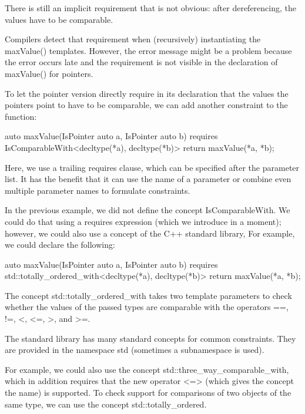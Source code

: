 There is still an implicit requirement that is not obvious: after dereferencing, the values have to be comparable.

Compilers detect that requirement when (recursively) instantiating the maxValue() templates. However, the error message might be a problem because the error occurs late and the requirement is not visible in the declaration of maxValue() for pointers.

To let the pointer version directly require in its declaration that the values the pointers point to have to be comparable, we can add another constraint to the function:

\begin{cpp}
auto maxValue(IsPointer auto a, IsPointer auto b)
requires IsComparableWith<decltype(*a), decltype(*b)>
{
	return maxValue(*a, *b);
}
\end{cpp}

Here, we use a trailing requires clause, which can be specified after the parameter list. It has the benefit that it can use the name of a parameter or combine even multiple parameter names to formulate constraints.


In the previous example, we did not define the concept IsComparableWith. We could do that using a requires expression (which we introduce in a moment); however, we could also use a concept of the C++ standard library, For example, we could declare the following:

\begin{cpp}
auto maxValue(IsPointer auto a, IsPointer auto b)
requires std::totally_ordered_with<decltype(*a), decltype(*b)>
{
	return maxValue(*a, *b);
}
\end{cpp}

The concept std::totally\_ordered\_with takes two template parameters to check whether the values of the passed types are comparable with the operators ==, !=, <, <=, >, and >=.

The standard library has many standard concepts for common constraints. They are provided in the namespace std (sometimes a subnamespace is used).

For example, we could also use the concept std::three\_way\_comparable\_with, which in addition requires that the new operator <=> (which gives the concept the name) is supported. To check support for comparisons of two objects of the same type, we can use the concept std::totally\_ordered.

